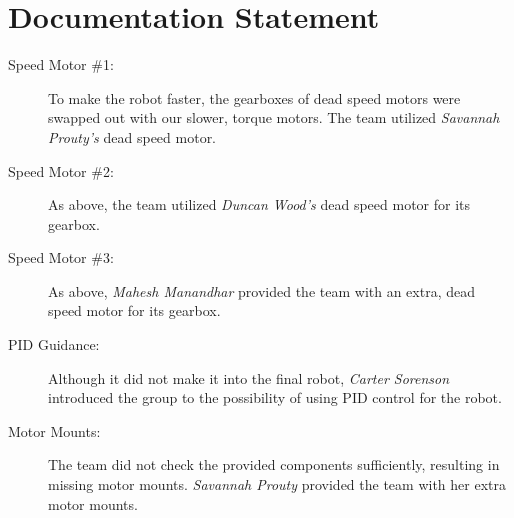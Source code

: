 \documentclass[11pt]{report}
\begin{document}

\nocite{*} %

\section*{Documentation Statement}
\begin{description}
    \item[Speed Motor \#1:] To make the robot faster, the gearboxes of dead speed motors were swapped out with our slower, torque motors. The team utilized \emph{Savannah Prouty's} dead speed motor.
    
    \item[Speed Motor \#2:] As above, the team utilized \emph{Duncan Wood's} dead speed motor for its gearbox.

    \item[Speed Motor \#3:] As above, \emph{Mahesh Manandhar} provided the team with an extra, dead speed motor for its gearbox. 
    
    \item[\gls{PID} Guidance:] Although it did not make it into the final robot, \emph{Carter Sorenson} introduced the group to the possibility of using \gls{PID} control for the robot.
    
    \item[Motor Mounts:] The team did not check the provided components sufficiently, resulting in missing motor mounts. \emph{Savannah Prouty} provided the team with her extra motor mounts.
\end{description}
\end{document}
